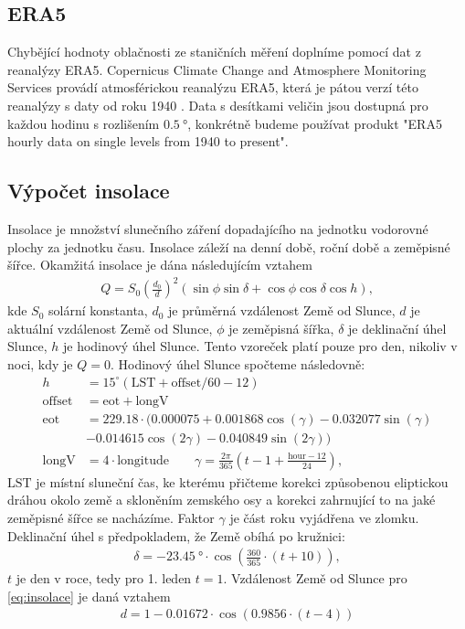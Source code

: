 \subsection{ERA5}\label{chap:era5}
Chybějící hodnoty oblačnosti ze staničních měření doplníme pomocí dat z reanalýzy ERA5. Copernicus Climate Change and Atmosphere Monitoring Services provádí atmosférickou reanalýzu ERA5, která je pátou verzí této reanalýzy s daty od roku 1940 \parencite{era5}. Data s desítkami veličin jsou dostupná pro každou hodinu s rozlišením $\SI{0.5}{\degree}$, konkrétně budeme používat produkt "ERA5 hourly data on single levels from 1940 to present".

\subsection{Výpočet insolace}\label{chap:insolation}
Insolace je množství slunečního záření dopadajícího na jednotku vodorovné plochy za jednotku času. Insolace záleží na denní době, roční době a zeměpisné šířce. Okamžitá insolace je dána následujícím vztahem \parencite{insolace}
\begin{gather}\label{eq:insolace}
Q = S_0\left(\frac{d_0}{d}\right)^2\left(\sin\phi\sin\delta + \cos\phi\cos\delta\cos h\right),
\end{gather}
kde $S_0$ solární konstanta, $d_0$ je průměrná vzdálenost Země od Slunce, $d$ je aktuální vzdálenost Země od Slunce, $\phi$ je zeměpisná šířka, $\delta$ je deklinační úhel Slunce, $h$ je hodinový úhel Slunce. Tento vzoreček platí pouze pro den, nikoliv v noci, kdy je $Q=0$. Hodinový úhel Slunce spočteme následovně: \parencite{hourangle}
\begin{equation}
	\begin{split}
		h &= 15^{\circ}\left(\text{LST}+\text{offset}/60-12\right)\\
		\text{offset} &= \text{eot} + \text{longV}\\
		\text{eot} &= 229.18\cdot(0.000075+0.001868\cos(\gamma)-0.032077\sin(\gamma)\\
		& -0.014615\cos(2\gamma)-0.040849\sin(2\gamma))\\
		\text{longV} &= 4\cdot\text{longitude}\qquad \gamma = \frac{2\pi}{365}\left(t - 1 + \frac{\text{hour}-12}{24}\right),
	\end{split}
\end{equation}
$\text{LST}$ je místní sluneční čas, ke kterému přičteme korekci způsobenou eliptickou dráhou okolo země a skloněním zemského osy a korekci zahrnující to na jaké zeměpisné šířce se nacházíme. Faktor $\gamma$ je část roku vyjádřena ve zlomku.
Deklinační úhel s předpokladem, že Země obíhá po kružnici: \parencite{declinationangle}
\begin{gather*}
\delta = \SI{-23.45}{\degree} \cdot \cos\left(\frac{360}{365}\cdot(t+10)\right),
\end{gather*}
$t$ je den v roce, tedy pro 1. leden $t=1$. Vzdálenost Země od Slunce pro \eqref{eq:insolace} je daná vztahem \parencite{sunearthdist}
\begin{gather*}
d = 1-0.01672\cdot \cos\left(0.9856\cdot(t-4)\right)
\end{gather*}

